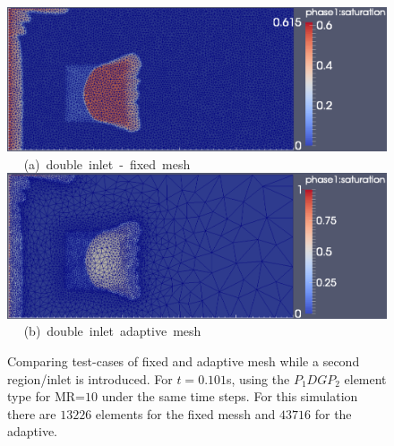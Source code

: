\begin{landscape}
\begin{figure}[ht] 
\vbox{
\hbox{\hspace{3.5cm}
\includegraphics[width=.9\textwidth]{./Pics1/mr10_5regions_fixed_dinlet/5regions_dinlet_fixed_100_1.pdf}
}
\vspace{0.0cm}
\hbox{\hspace{6.5cm} (a) double inlet - fixed mesh   
}
\hbox{\hspace{3.5cm}
  \includegraphics[width=.9\textwidth]{./Pics1/mr10_5regions_adapt_dinlet/5regions_dinlet_adapt_start_1.pdf}
}
\vspace{0.0cm}
\hbox{\hspace{6.5cm} (b) double inlet adaptive mesh   
}
}     
\caption{Comparing test-cases of fixed and adaptive mesh while a second region/inlet is introduced. For $t=0.101$s, using the $P_{1}DGP_{2}$ element type for MR=$10$ under the same time steps. For this simulation there are $13226$ elements for the fixed messh and $43716$ for the adaptive.}
\label{fig:3testcase_a}
\end{figure}
\end{landscape}
\clearpage

